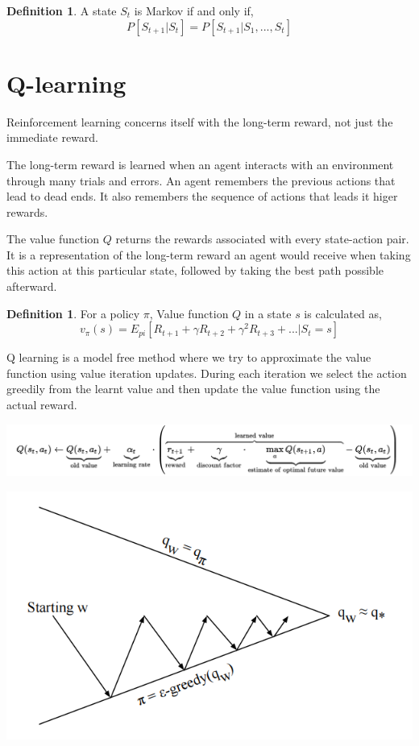 \documentclass[12pt]{extreport}
\theoremstyle{plain}
\theoremstyle{definition}
\newtheorem{defn}[thm]{Definition} %
\begin{document}
\begin{defn}
A state $ S_t $ is Markov if and only if,
$$ P[S_{t+1} | S_t] = P[S_{t+1} | S_1, ..., S_t] $$
\end{defn}


\section{Q-learning}

Reinforcement learning concerns itself with the long-term reward, not just
the immediate reward.

The long-term reward is learned when an agent interacts with an environment
through many trials and errors. An agent remembers the previous actions that
lead to dead ends. It also remembers the sequence of actions that
leads it higer rewards.

The value function $ Q $ returns the rewards associated with every state-action pair.
It is a representation of the long-term reward an agent would receive when
taking this action at this particular state, followed by taking the best path
possible afterward.

\begin{defn}
For a policy $ \pi $, Value function $ Q $ in a state $ s $ is calculated as,
$$ v_{\pi}(s) = E_{pi}[R_{t+1} + \gamma R_{t+2} + \gamma^2 R_{t+3} + ... | S_t = s] $$
\end{defn}

Q learning is a model free method where we try to approximate the value function
using value iteration updates. During each iteration we select the action greedily
from the learnt value and then update the value function using the actual reward.

\begin{center}
    \includegraphics[width=\linewidth]{q0.png}
\end{center}

\begin{center}
    \includegraphics[width=0.8\linewidth]{q1.png}
\end{center}
\end{document}
